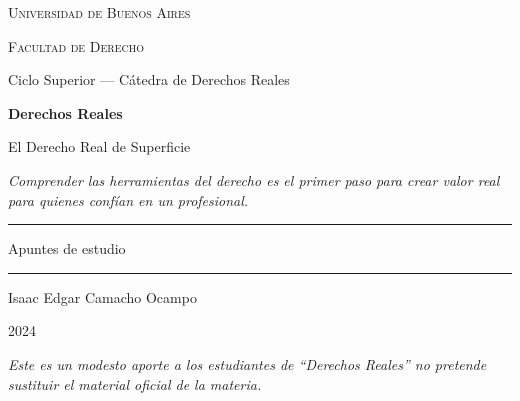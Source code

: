 \documentclass[12pt,oneside]{book}
\newcommand{\universidad}{Universidad de Buenos Aires}
\newcommand{\facultad}{Facultad de Derecho}
\newcommand{\carrera}{Ciclo Superior --- Cátedra de Derechos Reales}
\newcommand{\materia}{Derechos Reales}
\newcommand{\titulo}{El Derecho Real de Superficie}
\newcommand{\autor}{Isaac Edgar Camacho Ocampo}
\newcommand{\anio}{2024}
\begin{document}
\begin{titlepage}
\thispagestyle{empty}
\begin{center}

\vspace*{1cm}

{\large \textsc{\universidad}}

\vspace{0.2cm}

{\large \textsc{\facultad}}

\vspace{0.2cm}

{\large \carrera}

\vspace{3cm}

{\Huge \textbf{\materia}}

\vspace{1cm}

{\LARGE \titulo}

\vspace{0.8cm}

\textit{Comprender las herramientas del derecho es el primer paso para crear valor real para quienes confían en un profesional.}

\vspace{1.2cm}

\rule{0.70\textwidth}{0.5pt}

\vspace{0.5cm}

{\large Apuntes de estudio}

\vspace{0.5cm}

\rule{0.70\textwidth}{0.5pt}

\vfill

{\large \autor}

\vspace{0.3cm}

{\large \anio}

\end{center}

\vfill

\begin{flushleft}
\textit{Este es un modesto aporte a los estudiantes de ``Derechos Reales'' no pretende sustituir el material oficial de la materia.}
\end{flushleft}

\end{titlepage}

\tableofcontents
\thispagestyle{empty}
\newpage
\end{document}
